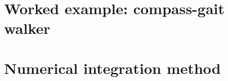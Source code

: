 \chapter{Worked example: compass-gait walker}
\setcounter{figure}{0}\setcounter{equation}{0}\setcounter{table}{0}

\clearpage

\chapter{Numerical integration method}
\setcounter{figure}{0}\setcounter{equation}{0}\setcounter{table}{0}

\clearpage

